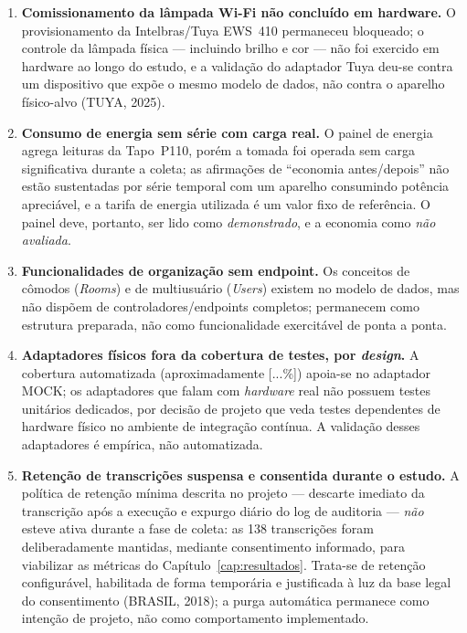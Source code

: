 \begin{enumerate}
  \item \textbf{Comissionamento da lâmpada Wi-Fi não concluído em hardware.} O
  provisionamento da Intelbras/Tuya EWS~410 permaneceu bloqueado; o controle da lâmpada
  física --- incluindo brilho e cor --- não foi exercido em hardware ao longo do estudo,
  e a validação do adaptador Tuya deu-se contra um dispositivo que expõe o mesmo modelo
  de dados, não contra o aparelho físico-alvo (TUYA, 2025).

  \item \textbf{Consumo de energia sem série com carga real.} O painel de energia
  agrega leituras da Tapo~P110, porém a tomada foi operada sem carga significativa
  durante a coleta; as afirmações de ``economia antes/depois'' não estão sustentadas por
  série temporal com um aparelho consumindo potência apreciável, e a tarifa de energia
  utilizada é um valor fixo de referência. O painel deve, portanto, ser lido como
  \emph{demonstrado}, e a economia como \emph{não avaliada}.

  \item \textbf{Funcionalidades de organização sem endpoint.} Os conceitos de cômodos
  (\textit{Rooms}) e de multiusuário (\textit{Users}) existem no modelo de dados, mas
  não dispõem de controladores/endpoints completos; permanecem como estrutura preparada,
  não como funcionalidade exercitável de ponta a ponta.

  \item \textbf{Adaptadores físicos fora da cobertura de testes, por \emph{design}.} A
  cobertura automatizada (aproximadamente [...\%]) %
  apoia-se no adaptador MOCK; os adaptadores que falam com \textit{hardware} real não
  possuem testes unitários dedicados, por decisão de projeto que veda testes dependentes
  de hardware físico no ambiente de integração contínua. A validação desses adaptadores
  é empírica, não automatizada.

  \item \textbf{Retenção de transcrições suspensa e consentida durante o estudo.} A
  política de retenção mínima descrita no projeto --- descarte imediato da transcrição
  após a execução e expurgo diário do log de auditoria --- \emph{não} esteve ativa
  durante a fase de coleta: as 138 transcrições foram deliberadamente mantidas, mediante
  consentimento informado, para viabilizar as métricas do Capítulo~\ref{cap:resultados}.
  Trata-se de retenção configurável, habilitada de forma temporária e justificada à luz
  da base legal do consentimento (BRASIL, 2018); a purga automática permanece como
  intenção de projeto, não como comportamento implementado.


\end{enumerate}
